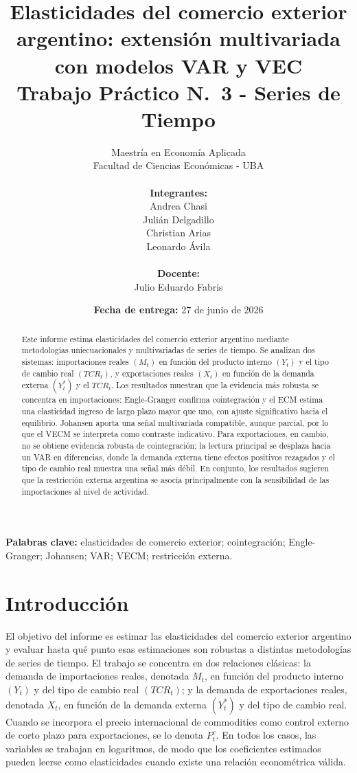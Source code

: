 \documentclass[11pt,a4paper]{article}
\title{%
	\textbf{Elasticidades del comercio exterior argentino: extensión multivariada con modelos VAR y VEC} \\
	\vspace{0.6em}
	\large Trabajo Práctico N.\textdegree~3 - Series de Tiempo
}
\author{
	Maestría en Economía Aplicada \\
	Facultad de Ciencias Económicas - UBA \\
	\\
	\textbf{Integrantes:} \\
	Andrea Chasi \\
	Julián Delgadillo \\
	Christian Arias \\
	Leonardo Ávila \\
	\\
	\textbf{Docente:} \\
	Julio Eduardo Fabris
}
\date{\textbf{Fecha de entrega:} 27 de junio de 2026}
\begin{document}
	
	\maketitle
	
	\begin{abstract}
		Este informe estima elasticidades del comercio exterior argentino mediante
		metodologías uniecuacionales y multivariadas de series de tiempo. Se analizan
		dos sistemas: importaciones reales \((M_t)\) en función del producto interno
		\((Y_t)\) y el tipo de cambio real \((TCR_t)\), y exportaciones reales
		\((X_t)\) en función de la demanda externa \((Y_t^*)\) y el \(TCR_t\). Los
		resultados muestran que la evidencia más robusta se concentra en
		importaciones: Engle-Granger confirma cointegración y el ECM estima una
		elasticidad ingreso de largo plazo mayor que uno, con ajuste significativo
		hacia el equilibrio. Johansen aporta una señal multivariada compatible, aunque
		parcial, por lo que el VECM se interpreta como contraste indicativo. Para
		exportaciones, en cambio, no se obtiene evidencia robusta de cointegración; la
		lectura principal se desplaza hacia un VAR en diferencias, donde la demanda
		externa tiene efectos positivos rezagados y el tipo de cambio real muestra una
		señal más débil. En conjunto, los resultados sugieren que la restricción
		externa argentina se asocia principalmente con la sensibilidad de las
		importaciones al nivel de actividad.
	\end{abstract}
	
	\noindent\textbf{Palabras clave:} elasticidades de comercio exterior;
	cointegración; Engle-Granger; Johansen; VAR; VECM; restricción externa.
	
	\newpage
	
	\section{Introducción}
	\label{sec:introduccion}
	
	El objetivo del informe es estimar las elasticidades del comercio exterior
	argentino y evaluar hasta qué punto esas estimaciones son robustas a distintas
	metodologías de series de tiempo. El trabajo se concentra en dos relaciones
	clásicas: la demanda de importaciones reales, denotada \(M_t\), en función del
	producto interno \((Y_t)\) y del tipo de cambio real \((TCR_t)\); y la demanda
	de exportaciones reales, denotada \(X_t\), en función de la demanda externa
	\((Y_t^*)\) y del tipo de cambio real. Cuando se incorpora el precio
	internacional de commodities como control externo de corto plazo para
	exportaciones, se lo denota \(P_t^c\). En todos los casos, las variables se
	trabajan en logaritmos, de modo que los coeficientes estimados pueden leerse
	como elasticidades cuando existe una relación econométrica válida.
	
\end{document}
